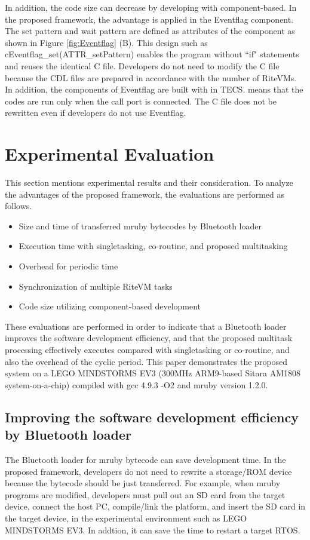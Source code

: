\documentclass{sig-alternate-05-2015}
\begin{document}
In addition, the code size can decrease by developing with component-based. 
In the proposed framework, the advantage is applied in the Eventflag component.
The set pattern and wait pattern are defined as attributes of the component as shown in Figure \ref{fig:Eventflag} (B).
This design such as {\myit cEventflag\_set(ATTR\_setPattern)} enables the program without ``if" statements and reuses the identical C file.
Developers do not need to modify the C file because the CDL files are prepared in accordance with the number of RiteVMs.
In addition, the components of Eventflag are built with {\myit [optional]} in TECS.
{\myit [optional]} means that the codes are run only when the call port is connected.
The C file does not be rewritten even if developers do not use Eventflag. 

\section{Experimental Evaluation}
\label{sec:Evaluation}
This section mentions experimental results and their consideration.
To analyze the advantages of the proposed framework, the evaluations are performed as follows.
\begin{itemize}
    \item Size and time of transferred mruby bytecodes by Bluetooth loader
    \item Execution time with singletasking, co-routine, and proposed multitasking
    \item Overhead for periodic time
    \item Synchronization of multiple RiteVM tasks
    \item Code size utilizing component-based development 
\end{itemize}

These evaluations are performed in order to indicate that a Bluetooth loader improves the software development efficiency, and that the proposed multitask processing effectively executes compared with singletasking or co-routine, and also the overhead of the cyclic period.
This paper demonstrates the proposed system on a LEGO MINDSTORMS EV3 \cite{par:EV3} (300MHz ARM9-based Sitara AM1808 system-on-a-chip) compiled with gcc 4.9.3 -O2 and mruby version 1.2.0.

\subsection{Improving the software development efficiency by Bluetooth loader}
The Bluetooth loader for mruby bytecode can save development time.
In the proposed framework, developers do not need to rewrite a storage/ROM device because the bytecode should be just transferred.
For example, when mruby programs are modified, developers must pull out an SD card from the target device, connect the host PC, compile/link the platform, and insert the SD card in the target device, in the experimental environment such as LEGO MINDSTORMS EV3.
In addtion, it can save the time to restart a target RTOS.
\end{document}
